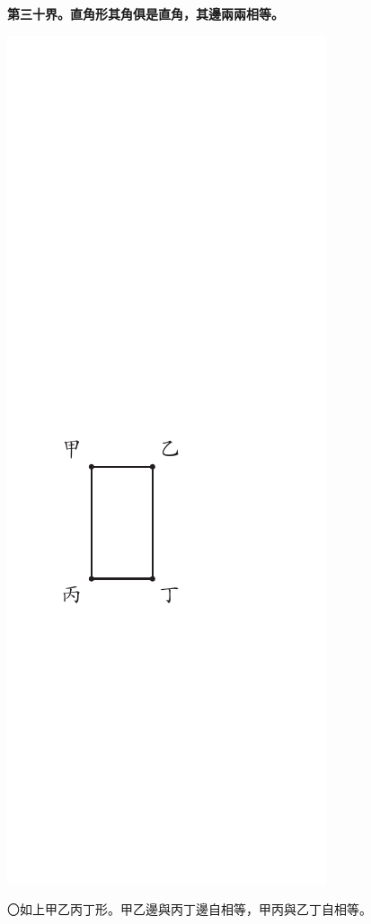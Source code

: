 \documentclass[12pt,b5paper,landscape]{article}
\newcommand{\bcom}[1]{〇#1}
\newcommand{\cthm}[1]{{
\vspace{8pt}

\bfseries #1}}
\begin{document}
\begin{multicols}{2}
\cthm{第三十界。直角形其角俱是直角，其邊兩兩相等。}
\begin{center}
\includegraphics[angle=90]{eu20}
\end{center}
\bcom{如上甲乙丙丁形。甲乙邊與丙丁邊自相等，甲丙與乙丁自相等。}


\end{multicols}
\end{document}
